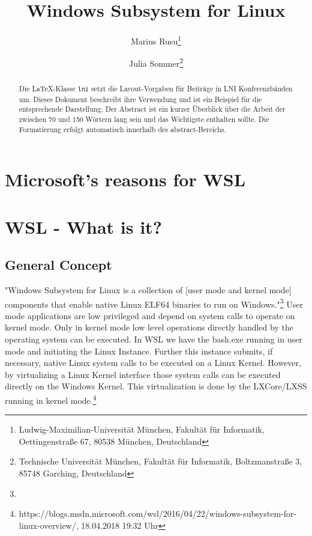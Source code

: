 \documentclass[utf8,biblatex]{lni}
\begin{document}
\title[Ein Kurztitel]{Windows Subsystem for Linux}
\author[Marius Rusu \and Julia Sommer]
{Marius Rusu\footnote{Ludwig-Maximilian-Universität München, Fakultät für Informatik, Oettingenstraße 67, 80538 München, Deutschland } \and
 Julia Sommer\footnote{Technische Universität München, Fakultät für Informatik, Boltzmanstraße 3, 85748 Garching, Deutschland }}
\maketitle

\begin{abstract}
Die \LaTeX-Klasse \texttt{lni} setzt die Layout-Vorgaben für Beiträge in LNI Konferenzbänden um.
Dieses Dokument beschreibt ihre Verwendung und ist ein Beispiel für die entsprechende Darstellung.
Der Abstract ist ein kurzer Überblick über die Arbeit der zwischen 70 und 150 Wörtern lang sein und das Wichtigste enthalten sollte.
Die Formatierung erfolgt automatisch innerhalb des abstract-Bereichs.
\end{abstract}

\section{Microsoft's reasons for WSL}
\section{WSL - What is it?}


\subsection{General Concept}
"Windows Subsystem for Linux is a collection of [user mode and kernel mode] components that enable native Linux ELF64 binaries to run on Windows."\footnote{} User mode applications are low privileged and depend on system calls to operate on kernel mode. Only in kernel mode low level operations directly handled by the operating system can be executed. In WSL we have the bash.exe running in user mode and initiating the Linux Instance. Further this instance submits, if necessary, native Linux system calls to be executed on a Linux Kernel. However, by virtualizing a Linux Kernel interface those system calls can be executed directly on the Windows Kernel. This virtualization is done by the LXCore/LXSS running in kernel mode.\footnote{ https://blogs.msdn.microsoft.com/wsl/2016/04/22/windows-subsystem-for-linux-overview/, 18.04.2018 19:32 Uhr}
\end{document}
